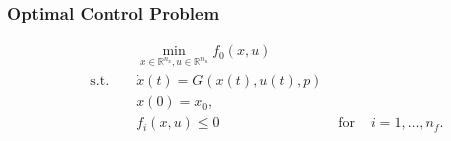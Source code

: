 

\begin{frame}
\frametitle{Optimal Control Problem}

\begin{align*}
 &&& \min_{x\in \mathbb{R}^{n_{x}}, u\in \mathbb{R}^{n_{u}}}  f_{0}(x, u)\\
& \text{ s.t. } && \dot{x}(t) = G(x(t), u(t), p) \\
&&& x(0) = x_0,\\
&&&  f_{i}(x,u) \leq 0 & \text{ for } & i=1,\ldots,n_{f}.
\end{align*}

\end{frame}